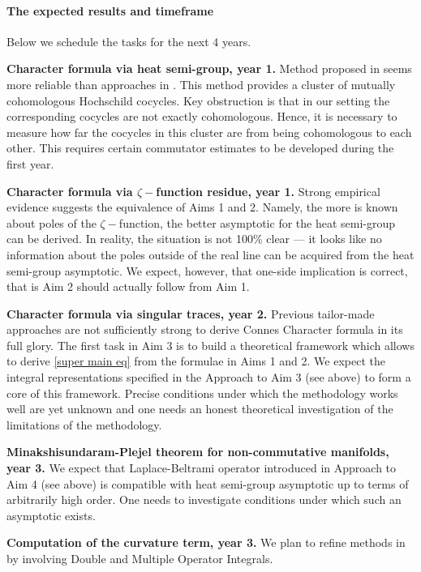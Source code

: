 \documentclass{article}
\begin{document}
\paragraph*{The expected results and timeframe} Below we schedule the tasks for the next 4 years.

{\bf Character formula via heat semi-group, year 1.} Method proposed in \cite{CRSZ} seems more reliable than approaches in \cite{GVF}. This method provides a cluster of mutually cohomologous Hochschild cocycles. Key obstruction is that in our setting the corresponding cocycles are not exactly cohomologous. Hence, it is necessary to measure how far the cocycles in this cluster are from being cohomologous to each other. This requires certain  commutator estimates to be developed during the first year.

{\bf Character formula via $\zeta-$function residue, year 1.} Strong empirical evidence suggests the equivalence of Aims 1 and 2. Namely, the more is known about poles of the $\zeta-$function, the better asymptotic for the heat semi-group can be derived. In reality, the situation is not 100\% clear --- it looks like no information about the poles outside of the real line can be acquired from the heat semi-group asymptotic. We expect, however, that one-side implication is correct, that is Aim 2 should actually follow from Aim 1.


{\bf Character formula via singular traces, year 2.} Previous tailor-made approaches \cite{CGRS} are not sufficiently strong to derive Connes Character formula in its full glory. The first task in Aim 3 is to build a theoretical framework which allows to derive \eqref{super main eq} from the formulae in Aims 1 and 2. We expect the integral representations specified in the Approach to Aim 3 (see above) to form a core of this framework. Precise conditions under which the methodology works well are yet unknown and one needs an honest theoretical investigation of the limitations of the methodology.


{\bf Minakshisundaram-Plejel theorem for non-commutative manifolds, year 3.} We expect that Laplace-Beltrami operator introduced in Approach to Aim 4 (see above) is compatible with heat semi-group asymptotic up to terms of arbitrarily high order. One needs to investigate conditions under which such an asymptotic exists. 

{\bf Computation of the curvature term, year 3.} We plan to refine methods in \cite{Lesch}  by involving Double and Multiple Operator Integrals. 
\end{document}
